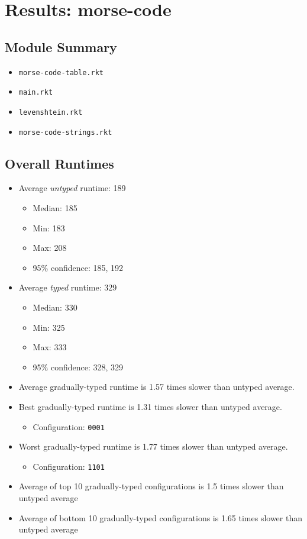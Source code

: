\documentclass{article}
\newcommand{\mono}[1]{\texttt{#1}}
\begin{document}
\section{Results: morse-code}

\subsection{Module Summary}
\begin{itemize}
\item \mono{morse-code-table.rkt}
\item \mono{main.rkt}
\item \mono{levenshtein.rkt}
\item \mono{morse-code-strings.rkt}\end{itemize}

\subsection{Overall Runtimes}
\begin{itemize}
\item Average \emph{untyped} runtime: 189
  \begin{itemize}
  \item Median: 185
  \item Min: 183
  \item Max: 208
  \item 95\% confidence: 185, 192
  \end{itemize}
\item Average \emph{typed} runtime: 329
  \begin{itemize}
  \item Median: 330
  \item Min: 325
  \item Max: 333
  \item 95\% confidence: 328, 329
  \end{itemize}
\item Average gradually-typed runtime is 1.57 times slower than untyped average.
\item Best gradually-typed runtime is 1.31 times slower than untyped average.
\begin{itemize}\item Configuration: \mono{0001}\end{itemize}
\item Worst gradually-typed runtime is 1.77 times slower than untyped average.
\begin{itemize}\item Configuration: \mono{1101}\end{itemize}
\item Average of top 10 gradually-typed configurations is 1.5 times slower than untyped average
\item Average of bottom 10 gradually-typed configurations is 1.65 times slower than untyped average
\end{itemize}
\end{document}

